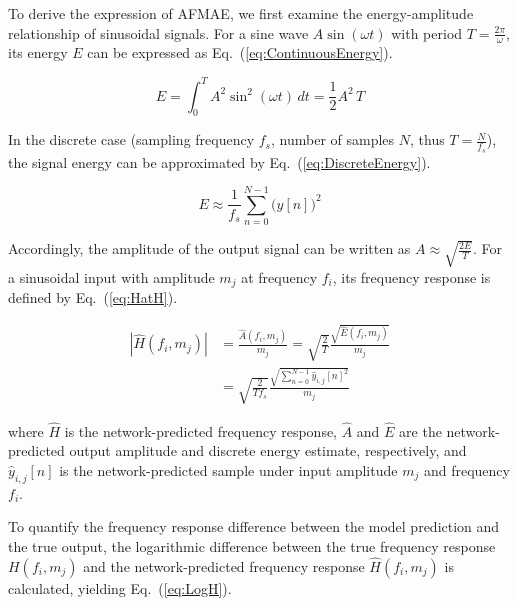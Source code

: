 \documentclass[journal]{IEEEtran}
\newcommand{\magn}{m} %
\newcommand{\fidx}{i} %
\newcommand{\midx}{j} %
\newcommand{\pidx}{n} %
\newcommand{\pmax}{N} %
\newcommand{\pred}[1]{\hat{#1}} %
\begin{document}
    
          To derive the expression of AFMAE, we first examine the energy-amplitude relationship of sinusoidal signals. For a sine wave $A\sin(\omega t)$ with period $T = \frac{2\pi}{\omega}$, its energy $E$ can be expressed as Eq.~(\ref{eq:ContinuousEnergy}).


          \begin{equation}
              E = \int_{0}^{T} A^2 \sin^2(\omega t) \, dt = \frac{1}{2} A^2 \, T
              \label{eq:ContinuousEnergy}
          \end{equation}

          
          In the discrete case (sampling frequency $f_s$, number of samples $\pmax$, thus $T = \frac{N}{f_s}$), the signal energy can be approximated by Eq.~(\ref{eq:DiscreteEnergy}).


          \begin{equation}
              E \approx \frac{1}{f_s} \sum_{\pidx=0}^{\pmax-1} \bigl(y[n]\bigr)^2
              \label{eq:DiscreteEnergy}
          \end{equation}

          Accordingly, the amplitude of the output signal can be written as $A \approx \sqrt{\frac{2E}{T}}$. For a sinusoidal input with amplitude $\magn_\midx$ at frequency $f_\fidx$, its frequency response is defined by Eq.~(\ref{eq:HatH}).

          \begin{equation}
              \begin{aligned}
                  \left|\pred{H}(f_\fidx,\magn_\midx)\right|
                   & = \frac{\pred{A}(f_\fidx,\magn_\midx)}{\magn_\midx}
                  = \sqrt{\frac{2}{T}} \frac{\sqrt{\hat{E}(f_\fidx,\magn_\midx)}}{\magn_\midx} \\
                   & = \sqrt{\frac{2}{T f_s}}
                  \frac{\sqrt{\sum_{\pidx=0}^{\pmax-1} \hat{y}_{\fidx,\midx}[n]^2}}{\magn_\midx}
              \end{aligned}
              \label{eq:HatH}
          \end{equation}

        
where $\pred{H}$ is the network-predicted frequency response, $\pred{A}$ and $\hat{E}$ are the network-predicted output amplitude and discrete energy estimate, respectively, and $\hat{y}_{\fidx,\midx}[n]$ is the network-predicted sample under input amplitude $\magn_\midx$ and frequency $f_\fidx$.


        To quantify the frequency response difference between the model prediction and the true output, the logarithmic difference between the true frequency response $H(f_\fidx,\magn_\midx)$ and the network-predicted frequency response $\pred{H}(f_\fidx,\magn_\midx)$ is calculated, yielding Eq.~(\ref{eq:LogH}).
\end{document}
